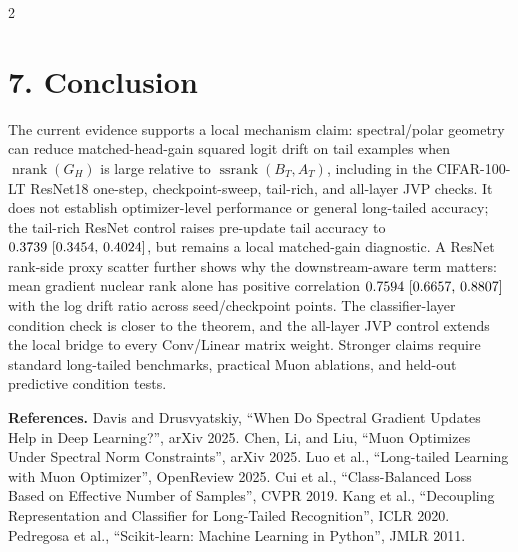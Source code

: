 \documentclass[10pt]{article}
\newcommand{\nrank}{\operatorname{nrank}}
\newcommand{\ssrank}{\operatorname{ssrank}}
\begin{document}
\begin{multicols}{2}
{\section*{7. Conclusion}
The current evidence supports a local mechanism claim: spectral/polar geometry can reduce matched-head-gain squared logit drift on tail examples when \(\nrank(G_H)\) is large relative to \(\ssrank(B_T,A_T)\), including in the CIFAR-100-LT ResNet18 one-step, checkpoint-sweep, tail-rich, and all-layer JVP checks. It does not establish optimizer-level performance or general long-tailed accuracy; the tail-rich ResNet control raises pre-update tail accuracy to \(0.3739 ~\text{[0.3454,\hspace{0.35em}0.4024]}\), but remains a local matched-gain diagnostic. A ResNet rank-side proxy scatter further shows why the downstream-aware term matters: mean gradient nuclear rank alone has positive correlation \(0.7594 ~\text{[0.6657,\hspace{0.35em}0.8807]}\) with the log drift ratio across seed/checkpoint points. The classifier-layer condition check is closer to the theorem, and the all-layer JVP control extends the local bridge to every Conv/Linear matrix weight. Stronger claims require standard long-tailed benchmarks, practical Muon ablations, and held-out predictive condition tests.

\vspace{-0.15em}
{\scriptsize
\textbf{References.}
Davis and Drusvyatskiy, ``When Do Spectral Gradient Updates Help in Deep Learning?'', arXiv 2025.
Chen, Li, and Liu, ``Muon Optimizes Under Spectral Norm Constraints'', arXiv 2025.
Luo et al., ``Long-tailed Learning with Muon Optimizer'', OpenReview 2025.
Cui et al., ``Class-Balanced Loss Based on Effective Number of Samples'', CVPR 2019.
Kang et al., ``Decoupling Representation and Classifier for Long-Tailed Recognition'', ICLR 2020.
Pedregosa et al., ``Scikit-learn: Machine Learning in Python'', JMLR 2011.
}
\par}
\end{multicols}
\end{document}
